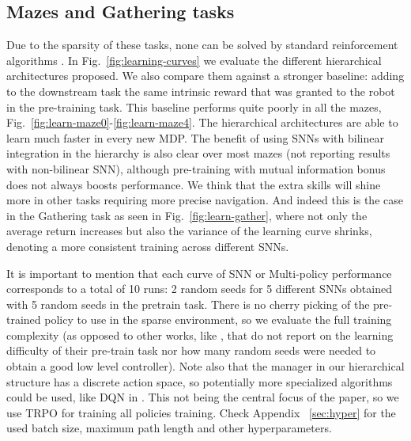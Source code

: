\documentclass{article} %
\begin{document}
\subsection{Mazes and Gathering tasks}
Due to the sparsity of these tasks, none can be solved by standard reinforcement algorithms \citep{duan2016benchmarking}. In Fig.\ \ref{fig:learning-curves} we evaluate the different hierarchical architectures proposed. We also compare them against a stronger baseline: adding to the downstream task the same intrinsic reward that was granted to the robot in the pre-training task. This baseline performs quite poorly in all the mazes, Fig.\ \ref{fig:learn-maze0}-\ref{fig:learn-maze4}. The hierarchical architectures are able to learn much faster in every new MDP. The benefit of using SNNs with bilinear integration in the hierarchy is also clear over most mazes (not reporting results with non-bilinear SNN), although pre-training with mutual information bonus does not always boosts performance. We think that the extra skills will shine more in other tasks requiring more precise navigation. And indeed this is the case in the Gathering task as seen in Fig.\ \ref{fig:learn-gather}, where not only the average return increases but also the variance of the learning curve shrinks, denoting a more consistent training across different SNNs. 

It is important to mention that each curve of SNN or Multi-policy performance corresponds to a total of 10 runs: 2 random seeds for 5 different SNNs obtained with 5 random seeds in the pretrain task. There is no cherry picking of the pre-trained policy to use in the sparse environment, so we evaluate the full training complexity (as opposed to other works, like \citet{heess2016learning}, that do not report on the learning difficulty of their pre-train task nor how many random seeds were needed to obtain a good low level controller).
Note also that the manager in our hierarchical structure has a discrete action space, so potentially more specialized algorithms could be used, like DQN in \citet{mnih2015human}. This not being the central focus of the paper, so we use TRPO for training all policies training. Check Appendix \ \ref{sec:hyper} for the used batch size, maximum path length and other hyperparameters. 
\end{document}
